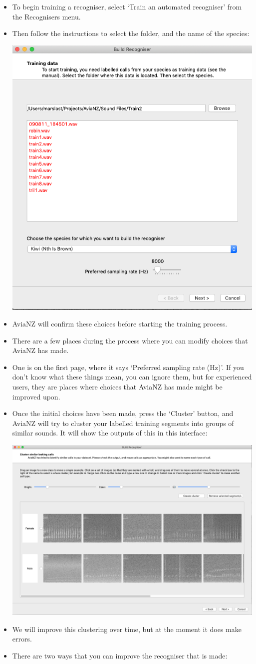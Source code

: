 \documentclass{article}
\begin{document}
\begin{itemize}

\item To begin training a recogniser, select `Train an automated recogniser' from the Recognisers menu. 
\item Then follow the instructions to select the folder, and the name of the species:
\begin{center}
    \includegraphics[width=.4\textwidth]{Figs/Wizard_start}
\end{center}

\item AviaNZ will confirm these choices before starting the training process. 
\item There are a few places during the process where you can modify choices that AviaNZ has made. 
\item One is on the first page, where it says `Preferred sampling rate (Hz)'. If you don't know what these things mean, you can ignore them, but for experienced users, they are places where choices that AviaNZ has made might be improved upon. 
\item Once the initial choices have been made, press the `Cluster' button, and AviaNZ will try to cluster your labelled training segments into groups of similar sounds. It will show the outputs of this in this interface:
\begin{center}
    \includegraphics[width=.6\textwidth]{Figs/Wizard_cluster}
\end{center}
\item We will improve this clustering over time, but at the moment it does make errors. 
\item There are two ways that you can improve the recogniser that is made:


\end{itemize}
\end{document}
